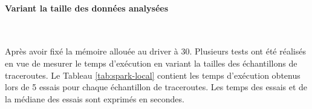 

\paragraph{Variant la taille des données analysées}~

Après avoir fixé la mémoire allouée au driver à $ 30 $. Plusieurs tests ont été réalisés en vue de mesurer le temps d'exécution en variant la tailles des échantillons de traceroutes. Le Tableau \ref{tab:spark-local} contient les temps d'exécution obtenus lors de 5 essais pour chaque échantillon de traceroutes. Les temps des essais et de la médiane des essais sont exprimés en secondes. 

